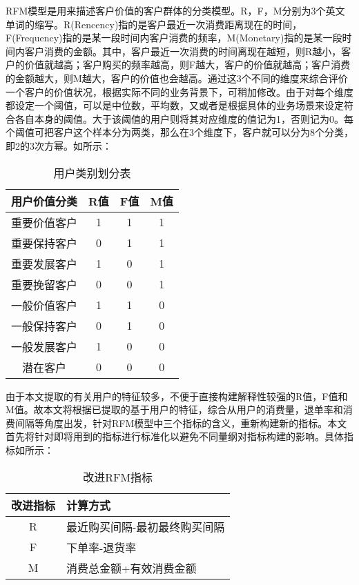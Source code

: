\documentclass[lang=cn,11pt,a4paper,cite=authoryear]{elegantpaper}
\begin{document}
RFM模型是用来描述客户价值的客户群体的分类模型。R，F，M分别为3个英文单词的缩写。R(Rencency)指的是客户最近一次消费距离现在的时间，F(Frequency)指的是某一段时间内客户消费的频率，M(Monetary)指的是某一段时间内客户消费的金额。其中，客户最近一次消费的时间离现在越短，则R越小，客户的价值就越高；客户购买的频率越高，则F越大，客户的价值就越高；客户消费的金额越大，则M越大，客户的价值也会越高。通过这3个不同的维度来综合评价一个客户的价值状况，根据实际不同的业务背景下，可稍加修改。由于对每个维度都设定一个阈值，可以是中位数，平均数，又或者是根据具体的业务场景来设定符合各自本身的阈值。大于该阈值的用户则将其对应维度的值记为1，否则记为0。每个阈值可把客户这个样本分为两类，那么在3个维度下，客户就可以分为8个分类，即2的3次方幂。如所示：
\begin{center}
  \begin{longtable}{c|c|c|c}
    \caption{用户类别划分表}
    \label{用户类别划分表}\\
      \hline
      \textbf{用户价值分类} & \textbf{R值} & \textbf{F值} & \textbf{M值} \\
      \hline
      重要价值客户 & 1 & 1 & 1 \\
      重要保持客户 & 0 & 1 & 1 \\
      重要发展客户 & 1 & 0 & 1 \\
      重要挽留客户 & 0 & 0 & 1 \\
      一般价值客户 & 1 & 1 & 0 \\
      一般保持客户 & 0 & 1 & 0 \\
      一般发展客户 & 1 & 0 & 0 \\
      潜在客户 & 0 & 0 & 0 \\
      \hline
  \end{longtable}
  \end{center}

由于本文提取的有关用户的特征较多，不便于直接构建解释性较强的R值，F值和M值。故本文将根据已提取的基于用户的特征，综合从用户的消费量，退单率和消费间隔等角度出发，针对RFM模型中三个指标的含义，重新构建新的指标。本文首先将针对即将用到的指标进行标准化以避免不同量纲对指标构建的影响。具体指标如所示：
\begin{center}
  \begin{longtable}{c|l}
    \caption{改进RFM指标}
    \label{改进指标}\\
    \hline
    \textbf{改进指标} & \textbf{计算方式} \\
    \hline
    R & 最近购买间隔-最初最终购买间隔 \\
    F & 下单率-退货率\\
    M & 消费总金额+有效消费金额 \\
    \hline
  \end{longtable}
\end{center}
\end{document}
